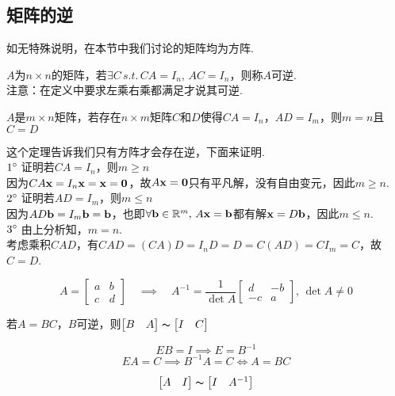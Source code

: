 \subsection{矩阵的逆}
如无特殊说明，在本节中我们讨论的矩阵均为方阵.
\begin{definition}[逆]
$A$为$n\times n$的矩阵，若$\exists C\,s.t.\,CA=I_n,\,AC=I_n$，则称$A$可逆.\\
注意：在定义中要求左乘右乘都满足才说其可逆.
\end{definition}
\begin{theorem}
$A$是$m\times n$矩阵，若存在$n\times m$矩阵$C$和$D$使得$CA=I_n$，$AD=I_m$，则$m=n$且$C=D$
\end{theorem}
\begin{analysis}
这个定理告诉我们只有方阵才会存在逆，下面来证明.\\
$1\degree\;$证明若$CA=I_n$，则$m\geq n$\\
因为$CA\mathbf{x}=I_n\mathbf{x}=\mathbf{x}=\mathbf{0}$，故$A\mathbf{x}=\mathbf{0}$只有平凡解，没有自由变元，因此$m\geq n$.\\
$2\degree\;$证明若$AD=I_m$，则$m\leq n$\\
因为$AD\mathbf{b}=I_m\mathbf{b}=\mathbf{b}$，也即$\forall \mathbf{b}\in\mathbb{R}^m,\,A\mathbf{x}=\mathbf{b}$都有解$\mathbf{x}=D\mathbf{b}$，因此$m\leq n$.\\
$3\degree\;$由上分析知，$m=n$.\\
考虑乘积$CAD$，有$CAD=(CA)D=I_nD=D=C(AD)=CI_m=C$，故$C=D$.
\end{analysis}
\begin{theorem}[二阶矩阵的逆]
\[A=\begin{bmatrix}
a&b\\c&d
\end{bmatrix}\quad\implies\quad
A^{-1}=\dfrac{1}{\det A}\begin{bmatrix}
d&-b\\-c&a
\end{bmatrix},\,\det A\ne 0\]
\end{theorem}
\begin{proposition}
\label{row_redu_alg}
若$A=BC$，$B$可逆，则$\begin{bmatrix}B&A\end{bmatrix}\thicksim\begin{bmatrix}I&C\end{bmatrix}$
\end{proposition}
\begin{analysis}
\[EB=I\implies E=B^{-1}\]
\[EA=C\implies B^{-1}A=C\iff A=BC\]
\end{analysis}
\begin{myalgorithm}[求逆]
\[\begin{bmatrix}A&I\end{bmatrix}\thicksim\begin{bmatrix}I&A^{-1}\end{bmatrix}\]
\end{myalgorithm}
